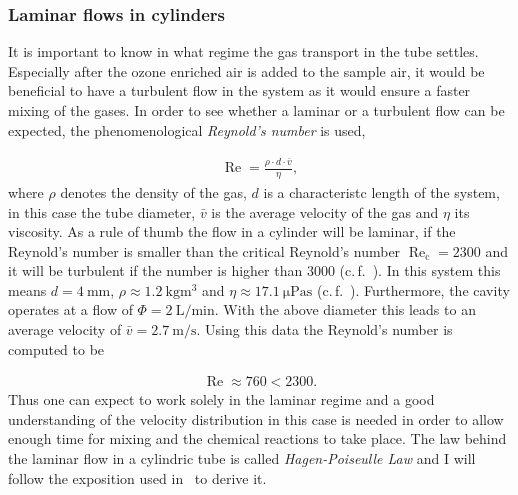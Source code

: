 \subsubsection{Laminar flows in cylinders}
\label{sec:cylinder}

It is important to know in what regime the gas transport in the tube
settles. Especially after the ozone enriched air is added to the
sample air, it would be beneficial to have a turbulent flow in the
system as it would ensure a faster mixing of the gases. In order to
see whether a laminar or a turbulent flow can be expected, the
phenomenological \emph{Reynold's number} is used,

\begin{align*}
  \operatorname{Re} = \frac{\rho \cdot d \cdot \bar v}{\eta},
\end{align*}
where $\rho$ denotes the density of the gas, $d$ is a characteristc
length of the system, in this case the tube diameter, $\bar v$ is the
average velocity of the gas and $\eta$ its viscosity. As a rule of
thumb the flow in a cylinder will be laminar, if the Reynold's number
is smaller than the critical Reynold's number
$\operatorname{Re}_{\text{c}} = 2300$ and it will be turbulent if the
number is higher than $3000$ (c.\,f.~\cite{maschbau}). In this system
this means $d = \SI{4}{\milli\meter}$,
$\rho \approx \SI{1.2}{\kilo\gram\cubic\meter}$ and
$\eta \approx \SI{17.1}{\micro\pascal\second}$
(c.\,f.~\cite{maschbau}). Furthermore, the cavity operates at a flow
of $\Phi = \SI{2}{\liter\per\minute}$. With the above diameter this
leads to an average velocity of
$\bar v = \SI{2.7}{\meter\per\second}$. Using this data the Reynold's
number is computed to be

\begin{align*}
  \operatorname{Re} \approx 760 < 2300.
\end{align*}
Thus one can expect to work solely in the laminar regime and a good
understanding of the velocity distribution in this case is needed in
order to allow enough time for mixing and the chemical reactions to
take place. The law behind the laminar flow in a cylindric tube is
called \emph{Hagen-Poiseulle Law} and I will follow the exposition used
in~\cite{gerthsen} to derive it.


